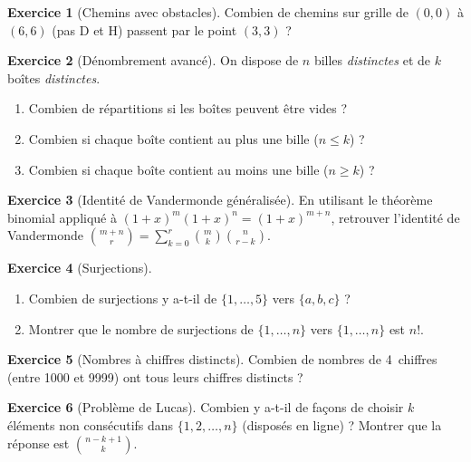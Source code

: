 \documentclass[12pt,a4paper,openany]{book}
\theoremstyle{definition}
\newtheorem{exercice}{Exercice}[chapter]
\theoremstyle{plain}
\theoremstyle{remark}
\begin{document}
\begin{exercice}[Chemins avec obstacles]\label{exo:chemins-obstacles}
Combien de chemins sur grille de $(0,0)$ à $(6,6)$ (pas D et H) passent par
le point $(3,3)$ ?
\end{exercice}

\begin{exercice}[Dénombrement avancé]\label{exo:denombrement-avance}
On dispose de $n$ billes \emph{distinctes} et de $k$ boîtes \emph{distinctes}.
\begin{enumerate}
  \item Combien de répartitions si les boîtes peuvent être vides ?
  \item Combien si chaque boîte contient au plus une bille ($n \leq k$) ?
  \item Combien si chaque boîte contient au moins une bille ($n \geq k$) ?
\end{enumerate}
\end{exercice}

\begin{exercice}[Identité de Vandermonde généralisée]\label{exo:vandermonde-gen}
En utilisant le théorème binomial appliqué à $(1+x)^m(1+x)^n = (1+x)^{m+n}$,
retrouver l'identité de Vandermonde
$\displaystyle\binom{m+n}{r} = \sum_{k=0}^{r}\binom{m}{k}\binom{n}{r-k}$.
\end{exercice}

\begin{exercice}[Surjections]\label{exo:surjections}
\begin{enumerate}
  \item Combien de surjections y a-t-il de $\{1,\ldots,5\}$ vers $\{a,b,c\}$ ?
  \item Montrer que le nombre de surjections de $\{1,\ldots,n\}$ vers
    $\{1,\ldots,n\}$ est $n!$.
\end{enumerate}
\end{exercice}

\begin{exercice}[Nombres à chiffres distincts]\label{exo:chiffres-distincts}
Combien de nombres de 4~chiffres (entre 1000 et 9999) ont tous leurs chiffres
distincts ?
\end{exercice}

\begin{exercice}[Problème de Lucas]\label{exo:lucas}
Combien y a-t-il de façons de choisir $k$ éléments non consécutifs dans
$\{1, 2, \ldots, n\}$ (disposés en ligne) ? Montrer que la réponse est
$\binom{n-k+1}{k}$.
\end{exercice}
\end{document}
